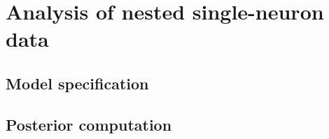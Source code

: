 \chapter{Analysis of nested single-neuron data}



\section{Model specification} 

\section{Posterior computation}
